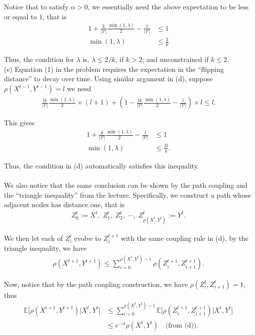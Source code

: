 \documentclass{article}
\newcommand{\qeds}{\hfill\qedsymbol}
\begin{document}
Notice that to satisfy $\alpha > 0$, we essentially need the above expectation to be less or equal to $1$, that is
\begin{align*}
	1 + \frac{k}{|\mathscr{V}|}\frac{\min(1, \lambda)}{2} - \frac{1}{|\mathscr{V}|} &\leq 1 \\
	\min(1, \lambda) &\leq \frac{2}{k}
\end{align*}

Thus, the condition for $\lambda$ is, $\lambda \leq 2/k$, if $k > 2$; and unconstrained if $ k \leq 2$.
\\

\noindent
(e) Equation (1) in the problem requires the expectation in the ``flipping distance'' to decay 
over time. Using similar argument in (d), suppose $\rho(X^{t-1}, Y^{t-1}) = l$ we need
\begin{align*}
	\frac{lk}{|\mathscr{V}|}\frac{\min(1, \lambda)}{2}\times(l+1) +(1 - \frac{lk}{|\mathscr{V}|}\frac{\min(1, \lambda)}{2} - \frac{l}{|\mathscr{V}|})\times l \leq l.
\end{align*}

This gives
\begin{align*}
	1 + \frac{k}{|\mathscr{V}|}\frac{\min(1, \lambda)}{2} - \frac{l}{|\mathscr{V}|} &\leq 1 \\
	\min(1, \lambda) &\leq \frac{2l}{k}.
\end{align*}

Thus, the condition in (d) automatically satisfies this inequality. \qeds
\\
\\

We also notice that the same conclusion can be shown by the path coupling
and the ``triangle inequality'' from the lecture. Specifically, we construct
a path whose adjacent nodes has distance one, that is
\begin{align*}
	Z^t_0 := X^t, \; Z^t_1, \; Z^t_2, \; \cdots, \; Z^t_{\rho(X^t, Y^t)} := Y^t.
\end{align*}

We then let each of $Z^t_i$ evolve to $Z^{t+1}_i$ with the same coupling rule in (d),
by the triangle inequality,
we have
\begin{align*}
	\rho(X^{t+1}, Y^{t+1}) \leq \sum_{i=0}^{\rho(X^t, Y^t) - 1}\rho(Z^{t+1}_i, Z^{t+1}_{i+1}).
\end{align*}

Now, notice that by the path coupling construction, we have $\rho(Z^t_i, Z^t_{i+1}) = 1$, thus
\begin{align*}
	\mathbb{E}\big[\rho(X^{t+1}, Y^{t+1}) \big| X^t, Y^t\big]
	&\leq
	\sum_{i=0}^{\rho(X^t, Y^t) - 1} \mathbb{E}\big[\rho(Z^{t+1}_i, Z^{t+1}_{i+1}) \big| X^t, Y^t\big]\\
	&\leq e^{-\alpha} \rho(X^t, Y^t) \quad \text{(from (d))}.
\end{align*}\qeds
\pagebreak
\end{document}
